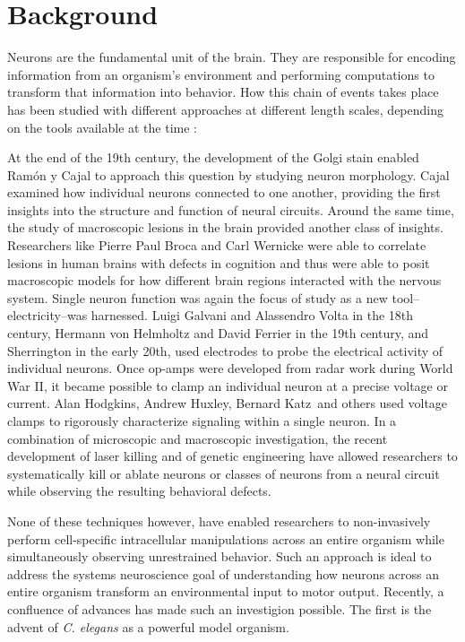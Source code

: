 \section{Background}
Neurons are the fundamental unit of the brain.  They are responsible for encoding information from an organism's environment and performing computations to transform that information into  behavior.  How this chain of events takes place has been studied with different approaches at different length scales, depending on the tools available at the time \citep{finger_origins_2001, kandel_essentials_1995}: 

At the end of the 19th century, the development of the Golgi stain enabled Ram\'on y Cajal to approach this question by studying neuron morphology.  Cajal examined how individual neurons connected to one another, providing the first insights into the structure and function of neural circuits. Around the same time, the study of macroscopic  lesions in the brain provided another class of insights. Researchers like Pierre Paul Broca and Carl Wernicke were able to correlate lesions in human brains with defects in cognition and thus were able to posit macroscopic models for how different brain regions interacted with the nervous system. Single neuron function was again the focus of study as a new tool--electricity--was harnessed.  Luigi Galvani and Alassendro Volta in the 18th century, Hermann von Helmholtz and David Ferrier in the 19th century, and  Sherrington in the early 20th, used electrodes to probe the electrical activity of individual neurons. Once  op-amps were developed from radar work during  World War II, it became possible to clamp an individual neuron at a precise voltage or current. Alan Hodgkins, Andrew Huxley, Bernard Katz and others used voltage clamps to rigorously characterize signaling within a single neuron. In a combination of microscopic and macroscopic investigation, the recent development of laser killing and of genetic engineering have allowed researchers to systematically kill or ablate  neurons or classes of neurons from a neural circuit while observing the resulting behavioral defects. 

None of these techniques however, have enabled researchers to non-invasively perform cell-specific intracellular manipulations  across an entire organism while simultaneously observing unrestrained behavior.  Such an approach is ideal to address the systems neuroscience goal of understanding how neurons across an entire  organism  transform an environmental input to motor output.  Recently, a confluence of advances has made such an investigion possible. The first is the advent of \textit{C. elegans} as a powerful model organism.

